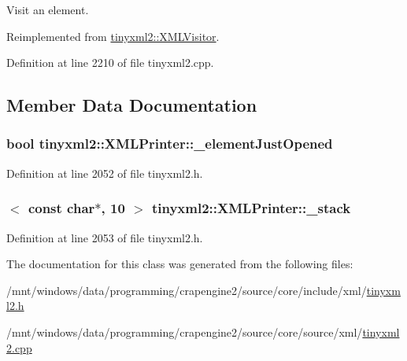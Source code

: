 Visit an element. 



Reimplemented from \hyperlink{classtinyxml2_1_1_x_m_l_visitor_a772f10ddc83f881956d32628faa16eb6}{tinyxml2\+::\+X\+M\+L\+Visitor}.



Definition at line 2210 of file tinyxml2.\+cpp.



\subsection{Member Data Documentation}
\hypertarget{classtinyxml2_1_1_x_m_l_printer_ac07169d58b465214a2b1fa306e617c26}{}
\subsubsection[{\+\_\+element\+Just\+Opened}]{\setlength{\rightskip}{0pt plus 5cm}bool tinyxml2\+::\+X\+M\+L\+Printer\+::\+\_\+element\+Just\+Opened\hspace{0.3cm}{\ttfamily [protected]}}\label{classtinyxml2_1_1_x_m_l_printer_ac07169d58b465214a2b1fa306e617c26}


Definition at line 2052 of file tinyxml2.\+h.

\hypertarget{classtinyxml2_1_1_x_m_l_printer_a99d59e67e084714541bee3ae43884bef}{}
\subsubsection[{\+\_\+stack}]{$<$ const char$\ast$, 10 $>$ tinyxml2\+::\+X\+M\+L\+Printer\+::\+\_\+stack\hspace{0.3cm}{\ttfamily [protected]}}\label{classtinyxml2_1_1_x_m_l_printer_a99d59e67e084714541bee3ae43884bef}


Definition at line 2053 of file tinyxml2.\+h.



The documentation for this class was generated from the following files\+:\begin{DoxyCompactItemize}
\item 
/mnt/windows/data/programming/crapengine2/source/core/include/xml/\hyperlink{tinyxml2_8h}{tinyxml2.\+h}\item 
/mnt/windows/data/programming/crapengine2/source/core/source/xml/\hyperlink{tinyxml2_8cpp}{tinyxml2.\+cpp}\end{DoxyCompactItemize}
